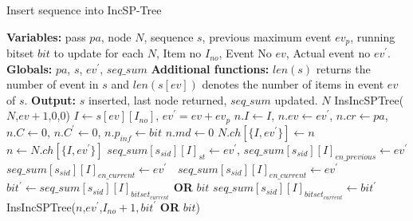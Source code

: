 \begin{algorithm}[!t]
    \small %
    \caption{Insert sequence into IncSP-Tree}\label{algorithm:insert}
    \begin{algorithmic}[1]
        \State \textbf{Variables: }pass $pa$, node $N$, sequence $s$, previous maximum event $ev_{p}$, running bitset $bit$ to update for each $N$, Item no $I_{no}$, Event No $ev$, Actual event no $ev^{\prime}$.
        \State \textbf{Globals: }$pa$, $s$, $ev^{\prime}$, $seq\_sum$
        \State \textbf{Additional functions: }$len(s)$ returns the number of event in $s$ and $len(s[ev])$ denotes the number of items in event $ev$ of $s$.
        \State \textbf{Output: }$s$ inserted, last node returned, $seq\_sum$ updated.
             
                \State  {}$N$
            \EndIf
             
                \State {}
                \State {} InsIncSPTree($N$,$ev+1$,0,0)
            \EndIf
            \State $I \gets s[ev][I_{no}]$, $ev^{\prime}=ev+ev_{p}$
             
                \State {}
                \State $n.I \gets I$, $n.ev \gets ev^{\prime}$, $n.cr \gets pa$, $n.C \gets 0$, $n.C^{\prime} \gets 0$, $n.p_{inf} \gets bit$
                \State $n.md \gets 0$ 
                \State $N.ch[\{I,ev^{\prime}\}] \gets n$ 
            \EndIf
            \State $n\gets N.ch[\{I,ev^{\prime}\}]$
            \State {}
            \State $seq\_sum[s_{sid}][I]_{st} \gets ev^{\prime}$,
            \State $seq\_sum[s_{sid}][I]_{en\_previous} \gets ev^{\prime}$
                \State $seq\_sum[s_{sid}][I]_{en\_current} \gets  ev^{\prime}$
            \Else  {}
            \State $\text{ }seq\_sum[s_{sid}][I]_{en\_current}\gets ev^{\prime}$
            \EndIf
            \State {}
            \State $bit^{\prime} \gets seq\_sum[s_{sid}][I]_{bitset_{current}}$\textbf{ OR }$bit$
            \State $seq\_sum[s_{sid}][I]_{bitset_{current}}\gets bit^{\prime}$ 
            \State {} InsIncSPTree($n$,$ev^{\prime}$,$I_{no}+1,bit^{\prime}$\textbf{ OR }$bit$)
                \State {}
        \EndProcedure
    \end{algorithmic}
\end{algorithm}


